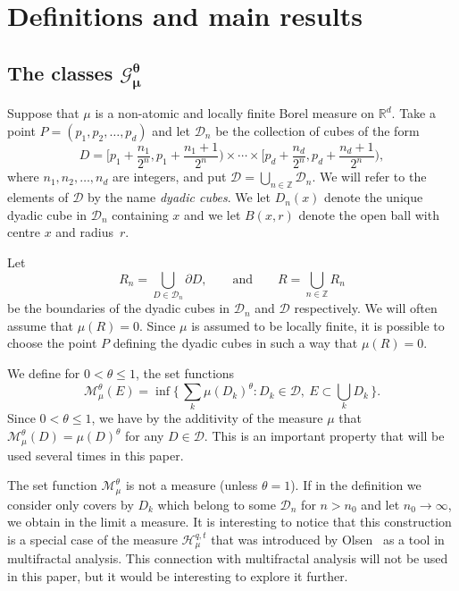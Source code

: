 \documentclass[11pt]{article}
\theoremstyle{definition}
\numberwithin{equation}{section}
\numberwithin{figure}{section}
\numberwithin{table}{section}
\begin{document}
\section{Definitions and main results} \label{sec:mainresults}

\subsection{The classes \texorpdfstring{$\boldsymbol{\mathscr{G}_\mu^\theta}$}{}} \label{sec:classes}

Suppose that $\mu$ is a non-atomic and locally finite Borel measure on $\mathbb{R}^d$. Take a point $P = (p_1, p_2, \ldots, p_d)$ and let $\mathscr{D}_n$ be the collection of cubes of the form
\[
D = \biggl[p_1 + \frac{n_1}{2^n}, p_1 + \frac{n_1 + 1}{2^n} \biggr)
\times \cdots \times \biggl[p_d + \frac{n_d}{2^n}, p_d + \frac{n_d + 1}{2^n} \biggr),
\]
where $n_1, n_2, \ldots, n_d$ are integers, and put $\mathscr{D} =
\bigcup_{n \in \mathbb{Z}} \mathscr{D}_n$. We will refer to the elements of $\mathscr{D}$ by the name {\em dyadic cubes}. We let $D_n (x)$ denote the unique dyadic cube in $\mathscr{D}_n$ containing $x$ and we let $B(x,r)$ denote the open ball with centre $x$ and radius~$r$.

Let
\[
R_n = \bigcup_{D \in \mathscr{D}_n} \partial D, \qquad \text{and} \qquad R = \bigcup_{n \in \mathbb{Z}} R_n
\]
be the boundaries of the dyadic cubes in $\mathscr{D}_n$ and $\mathscr{D}$ respectively. We will often assume that $\mu (R) = 0$. Since $\mu$ is assumed to be locally finite, it is possible to choose the point $P$ defining the dyadic cubes in such a way that $\mu (R) = 0$.

We define for $0 < \theta \leq 1$, the set functions
\[
\mathscr{M}_\mu^\theta (E) = \inf \biggl\{\, \sum_k \mu (D_k)^\theta : D_k \in \mathscr{D},\ E \subset \bigcup_k D_k \,\biggr\}.
\]
Since $0 < \theta \leq 1$, we have by the additivity of the measure $\mu$ that $\mathscr{M}_\mu^\theta (D) = \mu (D)^\theta$ for any $D
\in \mathscr{D}$. This is an important property that will be used several times in this paper.

The set function $\mathscr{M}_\mu^\theta$ is not a measure (unless $\theta = 1$). If in the definition we consider only covers by $D_k$ which belong to some $\mathscr{D}_n$ for $n > n_0$ and let $n_0 \to \infty$, we obtain in the limit a measure. It is interesting to notice that this construction is a special case of the measure $\mathscr{H}_\mu^{q,t}$ that was introduced by Olsen~\cite{olsen} as a tool in multifractal analysis. This connection with multifractal analysis will not be used in this paper, but it would be interesting to explore it further.
\end{document}
